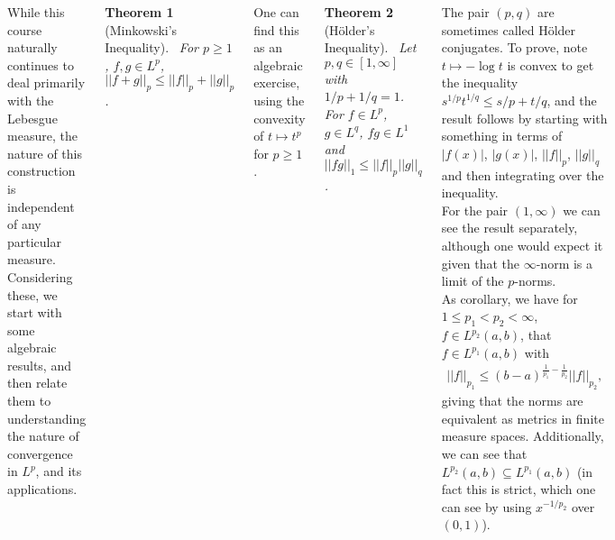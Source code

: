 \documentclass{tikzposter} %
\newtheorem{theorem}{Theorem}
\begin{document}
\begin{columns}
{        While this course naturally continues to deal primarily with the Lebesgue measure, the nature of this construction is independent of any particular measure. \\

        Considering these, we start with some algebraic results, and then relate them to understanding the nature of convergence in $L^{p}$, and its applications. \\

        \begin{theorem}[Minkowski's Inequality]
        \ For $p \ge 1$, $f, g \in L^{p}$, $|| f + g||_{p} \le ||f||_{p} + ||g||_{p}$.
        \end{theorem}
        \hphantom{}

        One can find this as an algebraic exercise, using the convexity of $t \mapsto t^{p}$ for $p \ge 1$. \\

        \begin{theorem}[H\"{o}lder's Inequality]
        \ Let $p, q \in [1,\infty]$ with $1/p + 1/q = 1$. For $f \in L^{p}$, $g \in L^{q}$, $fg \in L^{1}$ and $||fg||_{1} \le ||f||_{p} ||g||_{q}$.
        \end{theorem}
        \hphantom{}

        The pair $(p,q)$ are sometimes called H\"{o}lder conjugates. To prove, note $t \mapsto - \log t$ is convex to get the inequality $s^{1/p}t^{1/q} \le s/p + t/q$, and the result follows by starting with something in terms of $|f(x)|$, $|g(x)|$, $||f||_{p}$, $||g||_{q}$ and then integrating over the inequality. \\

        For the pair $(1,\infty)$ we can see the result separately, although one would expect it given that the $\infty$-norm is a limit of the $p$-norms. \\

        As corollary, we have for $1 \le p_{1} < p_{2} < \infty$, $f \in L^{p_{2}}(a,b)$, that $f \in L^{p_{1}}(a,b)$ with
        \begin{align*}
          ||f||_{p_{1}} \le (b-a)^{\frac{1}{p_{1}} - \frac{1}{p_{2}}} ||f||_{p_{2}},
        \end{align*}
        giving that the norms are equivalent as metrics in finite measure spaces. Additionally, we can see that $L^{p_{2}}(a,b) \subseteq L^{p_{1}}(a,b)$ (in fact this is strict, which one can see by using $x^{-1/p_{2}}$ over $(0,1)$). \\

}
\end{columns}
\end{document}
